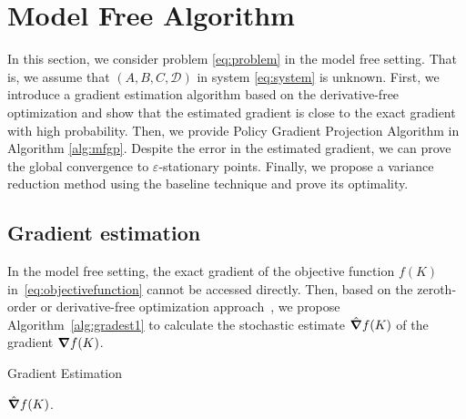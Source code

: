\section{Model Free Algorithm} \label{sec:model-free}
In this section, we consider problem \eqref{eq:problem} in the model free setting. That is, we assume that $(A, B, C, \mathcal D)$ in system \eqref{eq:system} is unknown. First, we introduce a gradient estimation algorithm
based on the derivative-free optimization and show that the estimated gradient is close to the exact gradient with high probability.
Then, we provide Policy Gradient Projection Algorithm in Algorithm \ref{alg:mfgp}.
Despite the error in the estimated gradient, we can prove the global convergence to $\varepsilon$-stationary points. 
Finally, we propose a variance reduction method using the baseline technique and prove its optimality.
\subsection{Gradient estimation}
In the model free setting, the exact gradient of the objective function $f(K)$
in~\eqref{eq:objectivefunction} cannot be accessed directly.
Then, based on the zeroth-order or derivative-free optimization approach~\cite{fazel2018global},
we propose Algorithm~\ref{alg:gradest1}
to calculate the stochastic estimate $\hat \grad f(K)$ of the gradient $\grad f(K)$.

\begin{algorithm}
  \caption{Gradient Estimation}
  \label{alg:gradest1}
  \begin{algorithmic}[1]
    \ENDFOR
    \RETURN $\hat \grad f(K)$.
  \end{algorithmic}
\end{algorithm}


